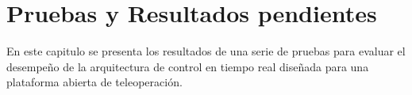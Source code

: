 \chapter{Pruebas y Resultados pendientes }

\begin{center}
\begin{minipage}{0,6\textwidth}
En este capitulo se presenta los resultados de una serie de pruebas para evaluar el desempeño de la arquitectura de control en tiempo real diseñada para una plataforma abierta de teleoperación.

\end{minipage}
\end{center}








\newpage
%
%
%
%
%
%
%
%
%
%
%
%
%
%








